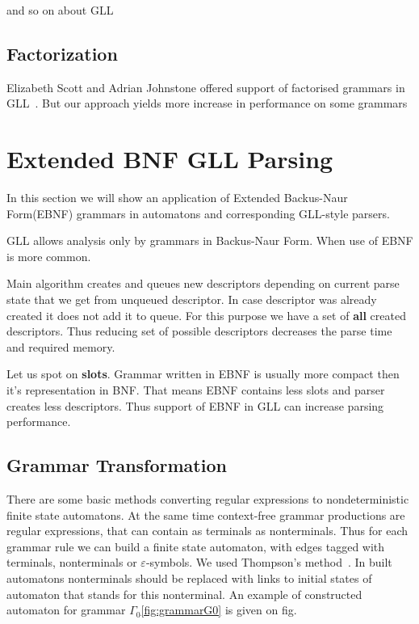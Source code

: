 \documentclass[runningheads,a4paper]{llncs}
\begin{document}
and so on about GLL

\subsection{Factorization}%

Elizabeth Scott and Adrian Johnstone offered support of factorised grammars in GLL~\cite{scott2016structuring}. 
But our approach yields more increase in performance on some grammars


\section{Extended BNF GLL Parsing}%

In this section we will show an application of Extended Backus-Naur Form(EBNF) grammars in automatons and corresponding GLL-style parsers.

GLL allows analysis only by grammars in Backus-Naur Form. When use of EBNF is more common.

Main algorithm creates and queues new descriptors depending on current parse state that we get from unqueued descriptor. 
In case descriptor was already created it does not add it to queue. For this purpose we have a set of
\textbf{all} created descriptors. Thus reducing set of possible descriptors decreases the parse time
and required memory.

Let us spot on \textbf{slots}. Grammar written in EBNF is usually more compact then it's representation in BNF. That means EBNF contains 
less slots and parser creates less descriptors. Thus support of EBNF in GLL can increase parsing performance. 


\subsection{Grammar Transformation}%

There are some basic methods converting regular expressions to nondeterministic finite state automatons. 
At the same time context-free grammar productions are regular expressions, that can contain as terminals 
as nonterminals. Thus for each grammar rule we can build a finite state automaton, with edges tagged with 
terminals, nonterminals or $\varepsilon$-symbols. We used Thompson's method~\cite{Thompson:1968:PTR:363347.363387}. 
In built automatons nonterminals should be replaced with links to initial states of automaton that stands 
for this nonterminal. An example of constructed automaton for grammar $\Gamma_{0}$\ref{fig:grammarG0} is given on fig.
\end{document}
